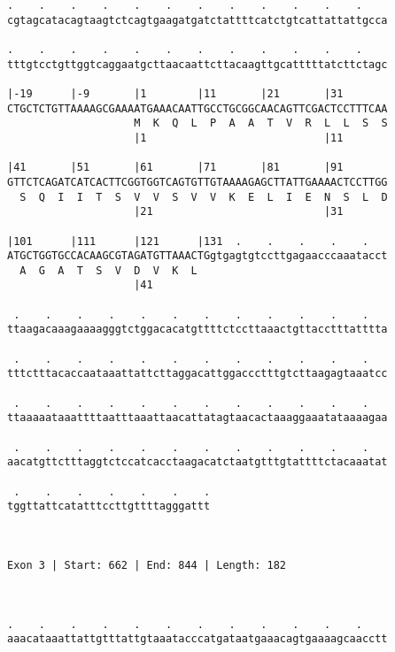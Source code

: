 \documentclass{article}
\begin{document}
\begin{Verbatim}
.    .    .    .    .    .    .    .    .    .    .    .    
cgtagcatacagtaagtctcagtgaagatgatctattttcatctgtcattattattgcca
                                                            
.    .    .    .    .    .    .    .    .    .    .    .    
tttgtcctgttggtcaggaatgcttaacaattcttacaagttgcatttttatcttctagc
                                                            
|-19      |-9       |1        |11       |21       |31       
CTGCTCTGTTAAAAGCGAAAATGAAACAATTGCCTGCGGCAACAGTTCGACTCCTTTCAA
                    M  K  Q  L  P  A  A  T  V  R  L  L  S  S
                    |1                            |11       
  
|41       |51       |61       |71       |81       |91       
GTTCTCAGATCATCACTTCGGTGGTCAGTGTTGTAAAAGAGCTTATTGAAAACTCCTTGG
  S  Q  I  I  T  S  V  V  S  V  V  K  E  L  I  E  N  S  L  D
                    |21                           |31       
  
|101      |111      |121      |131  .    .    .    .    .   
ATGCTGGTGCCACAAGCGTAGATGTTAAACTGgtgagtgtccttgagaacccaaatacct
  A  G  A  T  S  V  D  V  K  L                              
                    |41                                     
  
 .    .    .    .    .    .    .    .    .    .    .    .   
ttaagacaaagaaaagggtctggacacatgttttctccttaaactgttacctttatttta
                                                            
 .    .    .    .    .    .    .    .    .    .    .    .   
tttctttacaccaataaattattcttaggacattggaccctttgtcttaagagtaaatcc
                                                            
 .    .    .    .    .    .    .    .    .    .    .    .   
ttaaaaataaattttaatttaaattaacattatagtaacactaaaggaaatataaaagaa
                                                            
 .    .    .    .    .    .    .    .    .    .    .    .   
aacatgttctttaggtctccatcacctaagacatctaatgtttgtattttctacaaatat
                                                            
 .    .    .    .    .    .    .
tggttattcatatttccttgttttagggattt
                                
                                
 
Exon 3 | Start: 662 | End: 844 | Length: 182



.    .    .    .    .    .    .    .    .    .    .    .    
aaacataaattattgtttattgtaaatacccatgataatgaaacagtgaaaagcaacctt
                                                            

\end{Verbatim}
\end{document}
